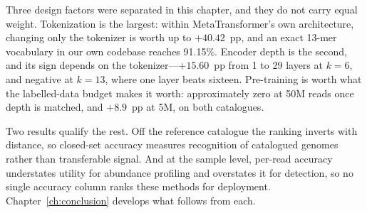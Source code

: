 Three design factors were separated in this chapter, and they do not carry equal
weight. Tokenization is the largest: within MetaTransformer's own architecture,
changing only the tokenizer is worth up to $+40.42$~pp, and an exact 13-mer
vocabulary in our own codebase reaches 91.15\%. Encoder depth is the second, and its
sign depends on the tokenizer---$+15.60$~pp from 1 to 29 layers at $k=6$, and
negative at $k=13$, where one layer beats sixteen. Pre-training is worth what the
labelled-data budget makes it worth: approximately zero at 50M reads once depth is
matched, and $+8.9$~pp at 5M, on both catalogues.

Two results qualify the rest. Off the reference catalogue the ranking inverts with
distance, so closed-set accuracy measures recognition of catalogued genomes rather
than transferable signal. And at the sample level, per-read accuracy understates
utility for abundance profiling and overstates it for detection, so no single
accuracy column ranks these methods for deployment. Chapter~\ref{ch:conclusion}
develops what follows from each.
